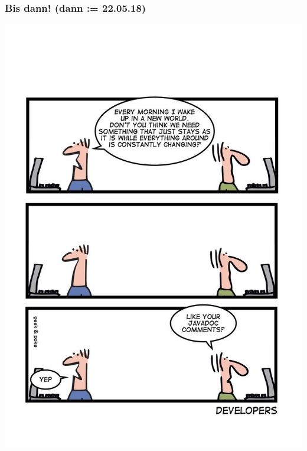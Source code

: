 \documentclass[18pt]{beamer}
\begin{document}
	\begin{frame}
		\frametitle{Bis dann! (dann := 22.05.18)}
		\centering
		\includegraphics[scale=0.86]{./comics/geek_and_poke_javadoc.jpg}
	\end{frame}
\end{document}
